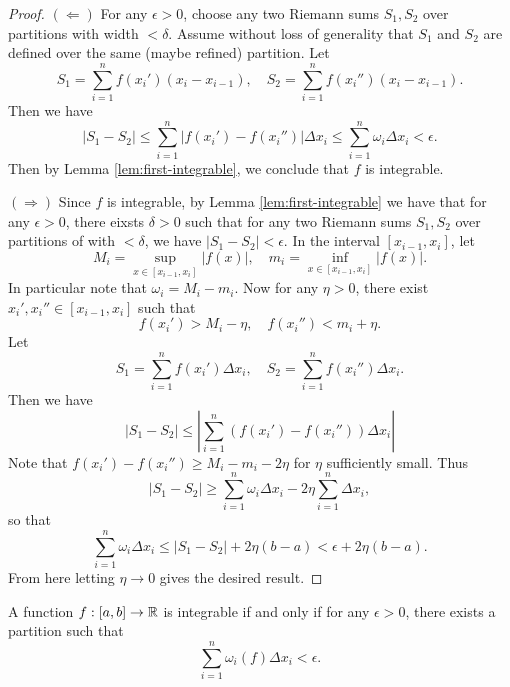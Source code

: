 \begin{proof}
  $(\Leftarrow)$ For any $\epsilon > 0$, choose any
  two Riemann sums $S_1, S_2$ over partitions with
  width $< \delta$. Assume without loss of generality
  that $S_1$ and $S_2$ are defined over the same
  (maybe refined) partition. Let
  \[
    S_1 = \sum_{i = 1}^n f(x_i') (x_i - x_{i - 1}),
    \quad
    S_2 = \sum_{i = 1}^n f(x_i'') (x_i - x_{i - 1}).
  \]
  Then we have
  \[
    |S_1 - S_2| \le \sum_{i = 1}^n |f(x_i') - f(x_i'')| \Delta x_i
    \le \sum_{i = 1}^n \omega_i \Delta x_i < \epsilon.
  \]
  Then by Lemma \ref{lem:first-integrable}, we conclude
  that $f$ is integrable.

  $(\Rightarrow)$ Since $f$ is integrable, by Lemma
  \ref{lem:first-integrable} we have that for any
  $\epsilon > 0$, there eixsts $\delta > 0$ such that
  for any two Riemann sums $S_1, S_2$ over partitions
  of with $< \delta$, we have $|S_1 - S_2| < \epsilon$.
  In the interval $[x_{i - 1}, x_i]$, let
  \[
    M_i = \sup_{x \in [x_{i - 1}, x_i]} |f(x)|, \quad
    m_i = \inf_{x \in [x_{i - 1}, x_i]} |f(x)|.
  \]
  In particular note that $\omega_i = M_i - m_i$.
  Now for any $\eta > 0$, there exist
  $x_i', x_i'' \in [x_{i - 1}, x_i]$ such that
  \[
    f(x_i') > M_i - \eta, \quad f(x_i'') < m_i + \eta.
  \]
  Let
  \[
    S_1 = \sum_{i = 1}^n f(x_i') \Delta x_i,
    \quad
    S_2 = \sum_{i = 1}^n f(x_i'') \Delta x_i.
  \]
  Then we have
  \[
    |S_1 - S_2| \le \left| \sum_{i = 1}^n (f(x_i') - f(x_i'')) \Delta x_i \right|
  \]
  Note that $f(x_i') - f(x_i'') \ge M_i - m_i - 2\eta$
  for $\eta$ sufficiently small. Thus
  \[
    |S_1 - S_2| \ge \sum_{i = 1}^n \omega_i \Delta x_i
    - 2\eta \sum_{i = 1}^n \Delta x_i,
  \]
  so that
  \[
    \sum_{i = 1}^n \omega_i \Delta x_i
    \le |S_1 - S_2| + 2\eta (b - a)
    < \epsilon + 2\eta (b - a).
  \]
  From here letting $\eta \to 0$ gives the desired result.
\end{proof}

\begin{theorem}
  A function $f : [a, b] \to \mathbb{R}$ is integrable if and only
  if for any $\epsilon > 0$, there exists a partition
  such that
  \[
    \sum_{i = 1}^n \omega_i(f) \Delta x_i < \epsilon.
  \]
\end{theorem}

